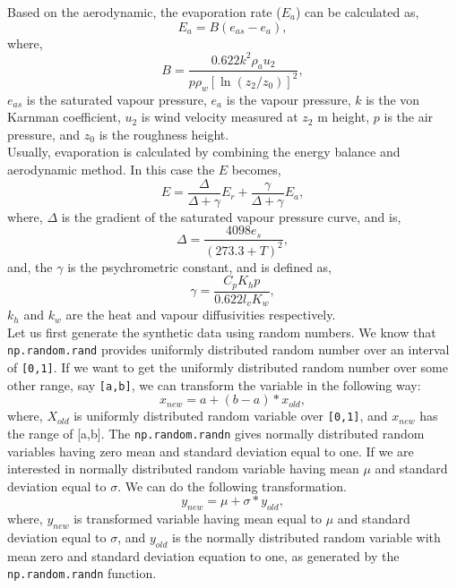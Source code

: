 \documentclass[10pt]{book}
\begin{document}
{Based on the aerodynamic, the evaporation rate ($E_a$) can be calculated as,
\begin{equation}
E_a = B\left(e_{as} - e_a\right),
\end{equation}
where,
\begin{equation}
B = \frac{0.622k^2 \rho_a u_2}{p \rho_w \left[\ln (z_2/z_0)\right]^2},
\end{equation}
$e_{as}$ is the saturated vapour pressure, $e_a$ is the vapour pressure, $k$ is the von Karnman coefficient, $u_2$ is wind velocity measured at $z_2$ m height, $p$ is the air pressure, and $z_0$ is the roughness height. \\

Usually, evaporation is calculated by combining the energy balance and aerodynamic method. In this case the $E$ becomes,
\begin{equation}
E = \frac{\Delta}{\Delta + \gamma} E_r + \frac{\gamma}{\Delta + \gamma}E_a,
\end{equation}
where, $\Delta$ is the gradient of the saturated vapour pressure curve, and is,
\begin{equation}
\Delta = \frac{4098 e_s}{(273.3+T)^2},
\end{equation}
and, the $\gamma$ is the psychrometric constant, and is defined as,
\begin{equation}
\gamma = \frac{C_p K_h p}{0.622 l_v K_w},
\end{equation}
$k_h$ and $k_w$ are the heat and vapour diffusivities respectively. \\

Let us first generate the synthetic data using random numbers. We know that \verb"np.random.rand" provides uniformly distributed random number over an interval of \verb"[0,1]". If we want to get the uniformly distributed random number over some other range, say \verb"[a,b]", we can transform the variable in the following way:
\begin{equation}
x_{new} = a + (b-a)*x_{old},
\end{equation}
where, $X_{old}$ is uniformly distributed random variable over \verb"[0,1]", and $x_{new}$ has the range of [a,b]. The \verb"np.random.randn" gives normally distributed random variables having zero mean and standard deviation equal to one. If we are interested in normally distributed random variable having mean $\mu$ and standard deviation equal to $\sigma$. We can do the following transformation.
\begin{equation}
y_{new} = \mu + \sigma*y_{old},
\end{equation}
where, $y_{new}$ is transformed variable having mean equal to $\mu$ and standard deviation equal to $\sigma$, and $y_{old}$ is the normally distributed random variable with mean zero and standard deviation equation to one, as generated by the \verb"np.random.randn" function. \\

}
\end{document}
